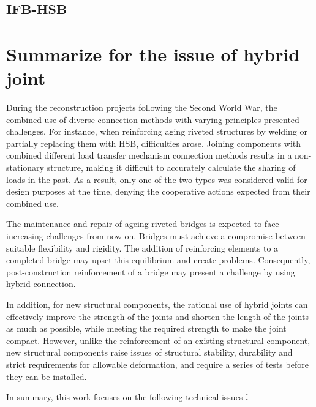 
\subsection{IFB-HSB}


\section{Summarize for the issue of hybrid joint}

During the reconstruction projects following the Second World War, the combined use of diverse connection methods with varying principles presented challenges. For instance, when reinforcing aging riveted structures by welding or partially replacing them with \ac{HSB}, difficulties arose. Joining components with combined different load transfer mechanism connection methods results in a non-stationary structure, making it difficult to accurately calculate the sharing of loads in the past. As a result, only one of the two types was considered valid for design purposes at the time, denying the cooperative actions expected from their combined use.

The maintenance and repair of ageing riveted bridges is expected to face increasing challenges from now on. Bridges must achieve a compromise between suitable flexibility and rigidity. The addition of reinforcing elements to a completed bridge may upset this equilibrium and create problems. Consequently, post-construction reinforcement of a bridge may present a challenge by using hybrid connection.

In addition, for new structural components, the rational use of hybrid joints can effectively improve the strength of the joints and shorten the length of the joints as much as possible, while meeting the required strength to make the joint compact.  However, unlike the reinforcement of an existing structural component, new structural components raise issues of structural stability, durability and strict requirements for allowable deformation, and require a series of tests before they can be installed.

In summary, this work focuses on the following technical issues：

